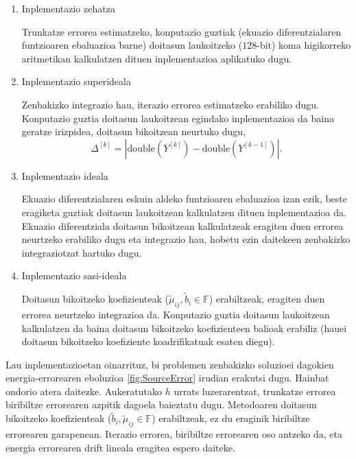 \begin{enumerate}
\renewcommand{\theenumi}{\Alph{enumi}}

\item Inplementazio zehatza

Trunkatze errorea estimatzeko, konputazio guztiak (ekuazio diferentzialaren funtzioaren ebaluazioa barne) doitasun laukoitzeko ($128$-bit) koma higikorreko aritmetikan kalkulatzen dituen inplementazioa aplikatuko dugu. 


\item Inplementazio superideala

Zenbakizko integrazio hau, iterazio errorea estimatzeko erabiliko dugu. Konputazio guztia doitasun laukoitzean egindako inplementazioa da baina geratze irizpidea, doitasun bikoitzean neurtuko dugu,
\begin{equation*}
\Delta^{[k]}=|\text{double}(Y^{[k]})-\text{double}(Y^{[k-1]})|.
\end{equation*}

\item Inplementazio ideala

Ekuazio diferentzialaren eskuin aldeko funtzioaren ebaluazioa izan ezik, beste eragiketa guztiak doitasun laukoitzean kalkulatzen dituen inplementazioa da. Ekuazio diferentziala doitasun bikoitzean kalkulatzeak eragiten duen errorea neurtzeko erabiliko dugu eta integrazio hau, hobetu ezin daitekeen zenbakizko integraziotzat hartuko dugu.  

\item Inplementazio sasi-ideala

Doitasun bikoitzeko koefizienteak ($\tilde{\mu}_{ij},\tilde{b}_i \in \mathbb{F}$) erabiltzeak, eragiten duen errorea neurtzeko integrazioa da. Konputazio guztia doitasun laukoitzean kalkulatzen da baina doitasun bikoitzeko koefizienteen balioak erabiliz (hauei doitasun bikoitzeko koefiziente koadrifikatuak esaten diegu). 

\end{enumerate}

Lau inplementazioetan oinarrituz, bi problemen zenbakizko soluzioei dagokien energia-errorearen eboluzioa \ref{fig:SourceError} irudian erakutsi dugu. Hainbat ondorio atera daitezke. Aukeratutako $h$ urrats luzerarentzat, trunkatze errorea biribiltze errorearen azpitik dagoela baieztatu dugu. Metodoaren doitasun bikoitzeko koefizienteak ($\tilde{b}_i, \tilde{\mu}_{ij}\in \mathbb{F}$) erabiltzeak, ez du eraginik biribiltze errorearen garapenean.  Iterazio errorea, biribiltze errorearen oso antzeko da, eta energia errorearen drift lineala eragitea espero daiteke. 

